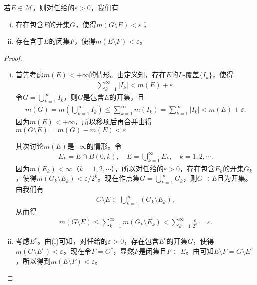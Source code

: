 \documentclass[../../main.tex]{subfiles}
\begin{document}
\begin{theorem}\label{theorem:定理2.13}
若$E\in\mathscr{M}$，则对任给的$\varepsilon > 0$，我们有
\begin{enumerate}[(i)]
\item 存在包含$E$的开集$G$，使得$m(G\setminus E)<\varepsilon$；
\item 存在含于$E$的闭集$F$，使得$m(E\setminus F)<\varepsilon$。
\end{enumerate}
\end{theorem}
\begin{proof}
\begin{enumerate}[(i)]
\item 首先考虑$m(E)<+\infty$的情形。由定义知，存在$E$的$L$-覆盖$\{I_k\}$，使得
\begin{align*}
\sum_{k = 1}^{\infty}|I_k|<m(E)+\varepsilon.
\end{align*}
令$G = \bigcup_{k = 1}^{\infty}I_k$，则$G$是包含$E$的开集，且
\begin{align*}
m\left( G \right) =m\left( \bigcup_{k=1}^{\infty}{I_k} \right) \leqslant \sum_{k=1}^{\infty}{m\left( I_k \right)}=\sum_{k=1}^{\infty}{\left| I_k \right|}<m(E)+\varepsilon .
\end{align*}
因为$m(E)<+\infty$，所以移项后再合并由得$m(G\setminus E)=m(G)-m(E)<\varepsilon$

其次讨论$m(E)$是$+\infty$的情形。令
\begin{align*}
E_k = E\cap B(0,k),\quad E=\bigcup_{k = 1}^{\infty}E_k,\quad k = 1,2,\cdots.
\end{align*}
因为$m(E_k)<\infty$（$k = 1,2,\cdots$），所以对任给的$\varepsilon>0$，存在包含$E_k$的开集$G_k$，使得$m(G_k\setminus E_k)<\varepsilon/2^k$。现在作点集$G = \bigcup_{k = 1}^{\infty}G_k$，则$G\supset E$且为开集。由我们有
\begin{align*}
G\setminus E\subset\bigcup_{k = 1}^{\infty}(G_k\setminus E_k),
\end{align*}
从而得
\begin{align*}
m(G\setminus E)\leqslant\sum_{k = 1}^{\infty}m(G_k\setminus E_k)<\sum_{k = 1}^{\infty}\frac{\varepsilon}{2^k}=\varepsilon.
\end{align*}
\item 考虑$E^c$。由(i)可知，对任给的$\varepsilon>0$，存在包含$E^c$的开集$G$，使得$m(G\setminus E^c)<\varepsilon$。现在令$F = G^c$，显然$F$是闭集且$F\subset E$。由可知$E\setminus F = G\setminus E^c$，所以得到$m(E\setminus F)<\varepsilon$。
\end{enumerate}

\end{proof}
\end{document}
